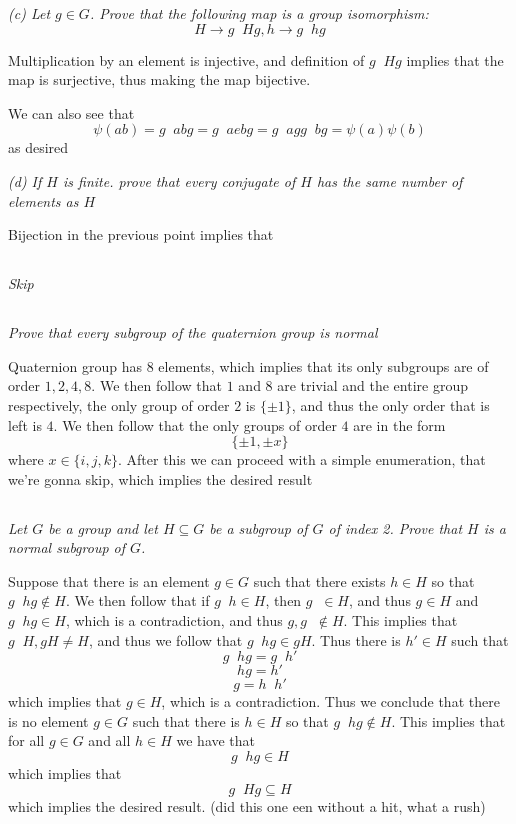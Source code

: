 \documentclass[11pt,oneside,titlepage]{book}
\DeclareMathOperator \inv {^{-1}}
\newcommand{\set}[1]{\{ #1 \}}
\begin{document}
\textit{(c) Let $g \in G$. Prove that the following map is a group
  isomorphism:
  $$H \to g\inv H g, h \to g\inv h g$$
}

Multiplication by an element is injective, and definition of $g\inv H
g$ implies that the map is surjective, thus making the map bijective.

We can also see that
$$\psi(a b) = g\inv a b g = g \inv a e b g = g \inv a g g\inv  b g = \psi(a) \psi(b)$$
as desired

\textit{(d) If $H$ is finite. prove that every conjugate of $H$ has
  the same number of elements as $H$}

Bijection in the previous point implies that

\subsection{}

\textit{Skip}

\subsection{}

\textit{Prove that every subgroup of the quaternion group is normal}

Quaternion group has $8$ elements, which implies that its only
subgroups are of order $1, 2, 4, 8$. We then follow that $1$ and $8$
are trivial and the entire group respectively, the only group of order
$2$ is $\set{\pm 1}$, and thus the only order that is left is $4$.  We
then follow that the only groups of order $4$ are in the form
$$\set{\pm 1, \pm x}$$
where $x \in \set{i, j, k}$. After this we can proceed with a simple
enumeration, that we're gonna skip, which implies the desired result

\subsection{}

\textit{Let $G$ be a group and let $H \subseteq G$ be a subgroup of
  $G$ of index 2.  Prove that $H$ is a normal subgroup of $G$.}

Suppose that there is an element $g \in G$ such that there exists $h
\in H$ so that $g\inv h g \notin H$. We then follow that if
$g\inv h \in H$, then $g\inv \in H$, and thus $g \in H$
and $g\inv h g \in H$, which is a contradiction, and thus
$g, g\inv \notin H$. This implies that $g\inv H, g H \neq H$,
and thus we follow that $g\inv h g \in gH$. Thus
there is $h' \in H$ such that
$$g\inv h g = g\inv h'$$
$$h g = h'$$
$$g = h\inv h'$$
which implies that $g \in H$, which is a contradiction. Thus
we conclude that there is no element $g \in G$ such that
there is $h \in H$ so that $g\inv h g \notin H$. This implies that
for all $g \in G$ and all $h \in H$ we have that 
$$g\inv h g \in H$$
which implies that
$$g\inv H g \subseteq H$$
which implies the desired result. (did this one een without a hit,
what a rush)
\end{document}
